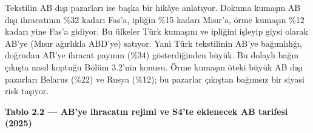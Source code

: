 Tekstilin AB dışı pazarları ise başka bir hikâye anlatıyor. Dokuma kumaşın AB dışı ihracatının \%32 kadarı Fas'a, ipliğin \%15 kadarı Mısır'a, örme kumaşın \%12 kadarı yine Fas'a gidiyor. Bu ülkeler Türk kumaşını ve ipliğini işleyip giysi olarak AB'ye (Mısır ağırlıkla ABD'ye) satıyor. Yani Türk tekstilinin AB'ye bağımlılığı, doğrudan AB'ye ihracat payının (\%34) gösterdiğinden büyük. Bu dolaylı bağın çıkışta nasıl koptuğu Bölüm 3.2'nin konusu. Örme kumaşın öteki büyük AB dışı pazarları Belarus (\%22) ve Rusya (\%12); bu pazarlar çıkıştan bağımsız bir siyasi risk taşıyor.


\textbf{Tablo 2.2 --- AB'ye ihracatın rejimi ve S4'te eklenecek AB tarifesi (2025)}

\nopagebreak[4]

\begingroup\gbtablo\footnotesize

